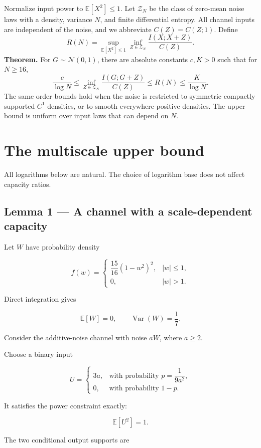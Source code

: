 \documentclass[11pt]{article}
\begin{document}
Normalize input power to $\mathbb E[X^2]\le 1$. Let $\mathcal Z_N$ be the class of zero-mean noise laws with a density, variance $N$, and finite differential entropy. All channel inputs are independent of the noise, and we abbreviate $C(Z)=C(Z;1)$. Define
\[
 R(N)=\sup_{\mathbb E[X^2]\le1}\inf_{Z\in\mathcal Z_N}\frac{I(X;X+Z)}{C(Z)}.
\]
\textbf{Theorem.} For $G\sim\mathcal N(0,1)$, there are absolute constants $c,K>0$ such that for $N\ge16$,
\[
 \frac{c}{\log N} \le
 \inf_{Z\in\mathcal Z_N}\frac{I(G;G+Z)}{C(Z)}
 \le R(N) \le \frac{K}{\log N}.
\]
The same order bounds hold when the noise is restricted to symmetric compactly supported $C^1$ densities, or to smooth everywhere-positive densities. The upper bound is uniform over input laws that can depend on $N$.

\section{The multiscale upper bound}

All logarithms below are natural. The choice of logarithm base does not affect capacity ratios.

\subsection{Lemma 1 --- A channel with a scale-dependent capacity}

Let \(W\) have probability density

\[
f(w)=
\begin{cases}
\dfrac{15}{16}(1-w^2)^2,& |w|\leq1,\\
0,& |w|>1.
\end{cases}
\]

Direct integration gives

\[
\mathbb E[W]=0,\qquad
\operatorname{Var}(W)=\frac17.
\]

Consider the additive-noise channel with noise \(aW\), where \(a\geq2\).

Choose a binary input

\[
U=
\begin{cases}
3a,&\text{with probability }p=\dfrac1{9a^2},\\
0,&\text{with probability }1-p.
\end{cases}
\]

It satisfies the power constraint exactly:

\[
\mathbb E[U^2]=1.
\]

The two conditional output supports are
\end{document}
